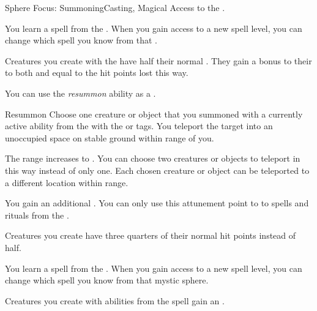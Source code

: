     \begin{feat}{Sphere Focus: Summoning}{Casting, Magical}
        \featpre Access to the  .

         You learn a spell from the  .
        When you gain access to a new spell level, you can change which spell you know from that .

         Creatures you create with the   have half their normal .
        They gain a bonus to their  to both  and  equal to the hit points lost this way.

         You can use the \textit{resummon} ability as a .
        \begin{freeability}{Resummon}
            Choose one creature or object that you summoned with a currently active ability from the   with the  or  tags.
            You teleport the target into an unoccupied space on stable ground within \rngmed range of you.

            \rankline
             The range increases to \rngdist.
             You can choose two creatures or objects to teleport in this way instead of only one.
                Each chosen creature or object can be teleported to a different location within range.
        \end{freeability}

         You gain an additional .
        You can only use this attunement point to  to spells and rituals from the  .

         Creatures you create have three quarters of their normal hit points instead of half.

         You learn a spell from the  .
        When you gain access to a new spell level, you can change which spell you know from that mystic sphere.

         Creatures you create with abilities from the  spell gain an .
    \end{feat}

